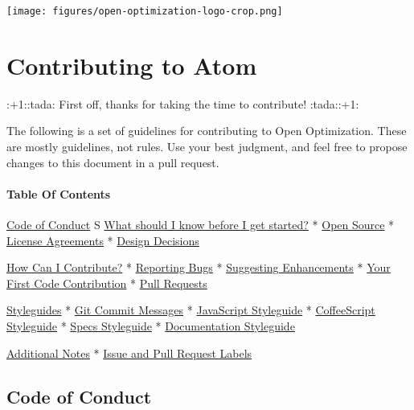\texttt{[image: figures/open-optimization-logo-crop.png]}

\hypertarget{contributing-to-atom}{%
\section{Contributing to Atom}\label{contributing-to-atom}}

:+1::tada: First off, thanks for taking the time to contribute!
:tada::+1:

The following is a set of guidelines for contributing to Open
Optimization. These are mostly guidelines, not rules. Use your best
judgment, and feel free to propose changes to this document in a pull
request.

\hypertarget{table-of-contents}{%
\paragraph{Table Of Contents}\label{table-of-contents}}

\protect\hyperlink{code-of-conduct}{Code of Conduct} S
\protect\hyperlink{what-should-i-know-before-i-get-started}{What should
I know before I get started?} * \protect\hyperlink{Open-source}{Open
Source} * \protect\hyperlink{Licenseux5cux2520agreements}{License
Agreements} * \protect\hyperlink{design-decisions}{Design Decisions}

\protect\hyperlink{how-can-i-contribute}{How Can I Contribute?} *
\protect\hyperlink{reporting-bugs}{Reporting Bugs} *
\protect\hyperlink{suggesting-enhancements}{Suggesting Enhancements} *
\protect\hyperlink{your-first-code-contribution}{Your First Code
Contribution} * \protect\hyperlink{pull-requests}{Pull Requests}

\protect\hyperlink{styleguides}{Styleguides} *
\protect\hyperlink{git-commit-messages}{Git Commit Messages} *
\protect\hyperlink{javascript-styleguide}{JavaScript Styleguide} *
\protect\hyperlink{coffeescript-styleguide}{CoffeeScript Styleguide} *
\protect\hyperlink{specs-styleguide}{Specs Styleguide} *
\protect\hyperlink{documentation-styleguide}{Documentation Styleguide}

\protect\hyperlink{additional-notes}{Additional Notes} *
\protect\hyperlink{issue-and-pull-request-labels}{Issue and Pull Request
Labels}

\hypertarget{code-of-conduct}{%
\subsection{Code of Conduct}\label{code-of-conduct}}

